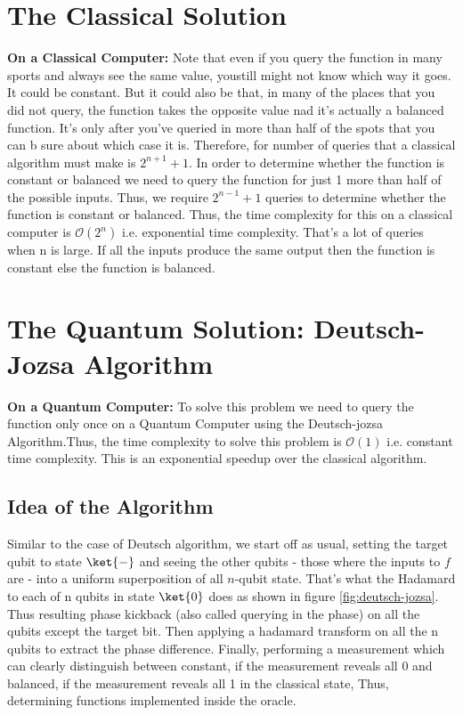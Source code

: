 \documentclass[12pt, oneside]{book}
\theoremstyle{definition}
\theoremstyle{definition}
\theoremstyle{remark}
\begin{document}
\section{The Classical Solution}
\textbf{On a Classical Computer: }Note that even if you query the function in many sports and always see the same value, youstill might not know which way it goes. It could be constant. But it could also be that, in many of the places that you did not query, the function takes the opposite value nad it's actually a balanced function. It's only after you've queried in more than half of the spots that you can b sure about which case it is. Therefore, for number of queries that a classical algorithm must make is $2^{n+1}+1$. In order to determine whether the function is constant or balanced we need to query the function for just 1 more than half of the possible inputs. Thus, we require $2^{n-1}+1$ queries to determine whether the function is constant or balanced.
Thus, the time complexity for this on a classical computer is $\mathcal{O}(2^n)$ i.e. exponential time complexity. That's a lot of queries when n is large. If all the inputs produce the same output then the function is constant else the function is balanced.

\section{The Quantum Solution: Deutsch-Jozsa Algorithm}
\textbf{On a Quantum Computer: }To solve this problem we need to query the function only once on a Quantum Computer using the Deutsch-jozsa Algorithm.Thus, the time complexity to solve this problem is $\mathcal{O}(1)$ i.e. constant time complexity. This is an exponential speedup over the classical algorithm. 

\subsection{Idea of the Algorithm}
Similar to the case of Deutsch algorithm, we start off as usual, setting the target qubit to state $\ket{-}$ and seeing the other qubits - those where the inputs to $f$ are - into a uniform superposition of all $n$-qubit state. That's what the Hadamard to each of n qubits in state $\ket{0}$ does as shown in figure \ref{fig:deutsch-jozsa}. Thus resulting phase kickback (also called querying in the phase) on all the qubits except the target bit. Then applying a hadamard transform on all the n qubits to extract the phase difference. Finally, performing a measurement which can clearly distinguish between constant, if the measurement reveals all 0 and balanced, if the measurement reveals all 1 in the classical state, Thus, determining functions implemented inside the oracle. 
\end{document}

